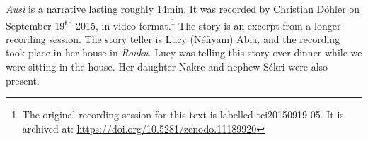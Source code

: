 \textit{Ausi} is a narrative lasting roughly 14min. It was recorded by Christian Döhler on September 19\textsuperscript{th} 2015, in video format.\footnote{The original recording session for this text is labelled tci20150919-05. It is archived at: \href{https://doi.org/10.5281/zenodo.11189920}{https://doi.org/10.5281/zenodo.11189920}} The story is an excerpt from a longer recording session. The story teller is Lucy (Néfiyam) Abia, and the recording took place in her house in \textit{Rouku}. Lucy was telling this story over dinner while we were sitting in the house. Her daughter Nakre and nephew Sékri were also present.